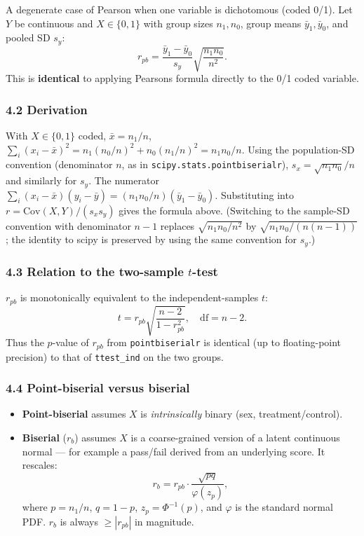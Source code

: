 \documentclass{article}
\providecommand{\tightlist}{\setlength{\itemsep}{0pt}\setlength{\parskip}{0pt}}
\begin{document}
A degenerate case of Pearson when one variable is dichotomous (coded
0/1). Let \(Y\) be continuous and \(X \in \{0, 1\}\) with group sizes
\(n_1, n_0\), group means \(\bar{y}_1, \bar{y}_0\), and pooled SD
\(s_y\): \[
r_{pb} = \frac{\bar{y}_1 - \bar{y}_0}{s_y}\sqrt{\frac{n_1 n_0}{n^2}}.
\] This is \textbf{identical} to applying Pearson\textquotesingle s
formula directly to the 0/1 coded variable.

\subsubsection{4.2 Derivation}\label{42-derivation}

With \(X \in \{0, 1\}\) coded, \(\bar{x} = n_1 / n\),
\(\sum_i (x_i - \bar{x})^2 = n_1 (n_0/n)^2 + n_0 (n_1/n)^2 = n_1 n_0 / n\).
Using the population-SD convention (denominator \(n\), as in
\texttt{scipy.stats.pointbiserialr}), \(s_x = \sqrt{n_1 n_0}/n\) and
similarly for \(s_y\). The numerator
\(\sum_i (x_i - \bar{x})(y_i - \bar{y}) = (n_1 n_0 / n)(\bar{y}_1 - \bar{y}_0)\).
Substituting into \(r = \mathrm{Cov}(X,Y)/(s_x s_y)\) gives the formula
above. (Switching to the sample-SD convention with denominator \(n-1\)
replaces \(\sqrt{n_1 n_0/n^2}\) by \(\sqrt{n_1 n_0/(n(n-1))}\); the
identity to scipy is preserved by using the same convention for \(s_y\).)

\subsubsection{\texorpdfstring{4.3 Relation to the two-sample
\(t\)-test}{4.3 Relation to the two-sample t-test}}\label{43-relation-to-the-two-sample-t-test}

\(r_{pb}\) is monotonically equivalent to the independent-samples \(t\):
\[
t = r_{pb} \sqrt{\frac{n - 2}{1 - r_{pb}^2}}, \quad \mathrm{df} = n - 2.
\] Thus the \(p\)-value of \(r_{pb}\) from \texttt{pointbiserialr} is
identical (up to floating-point precision) to that of
\texttt{ttest\_ind} on the two groups.

\subsubsection{4.4 Point-biserial versus
biserial}\label{44-point-biserial-versus-biserial}

\begin{itemize}
\tightlist
\item
  \textbf{Point-biserial} assumes \(X\) is \emph{intrinsically} binary
  (sex, treatment/control).
\item
  \textbf{Biserial} (\(r_b\)) assumes \(X\) is a coarse-grained version
  of a latent continuous normal --- for example a pass/fail derived from
  an underlying score. It rescales: \[
  r_b = r_{pb} \cdot \frac{\sqrt{pq}}{\varphi(z_p)},
  \] where \(p = n_1/n\), \(q = 1-p\), \(z_p = \Phi^{-1}(p)\), and
  \(\varphi\) is the standard normal PDF. \(r_b\) is always
  \(\geq |r_{pb}|\) in magnitude.
\end{itemize}
\end{document}
